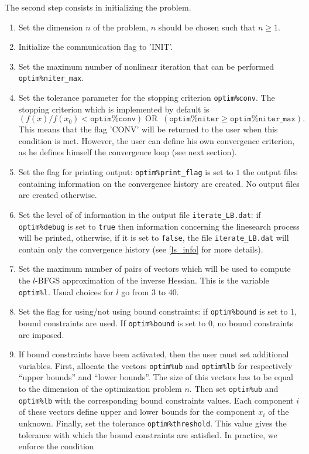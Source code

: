 \documentclass[a4paper,twoside,final,onecolumn,11pt,openright]{article}
\begin{document}
The second step consists in initializing the problem.
\begin{enumerate}
 \item Set the dimension $n$ of the problem, $n$ should be chosen such that $n\geq1$.
 \item Initialize the communication flag to 'INIT'.
 \item Set the maximum number of nonlinear iteration that can be performed \texttt{optim\%niter\_max}.
 \item Set the tolerance parameter for the stopping criterion \texttt{optim\%conv}. The stopping criterion which is implemented by default is 
\begin{equation}
 \left(f(x)/f(x_0)< \texttt{optim\%conv}\right) \; \textrm{OR} \;\;  \left(\texttt{optim\%niter}\geq\texttt{optim\%niter\_max}\right).
\end{equation}
This means that the flag 'CONV' will be returned to the user when this condition is met. However, the user can define his own convergence criterion, as he defines himself the convergence loop (see next section). 
\item  Set the flag for printing output: \texttt{optim\%print\_flag} is set to $1$ the output files containing information on the convergence history are created. No output files are created otherwise.
 \item Set the level of of information in the output file \texttt{iterate\_LB.dat}: if \texttt{optim\%debug} is set to \texttt{true} then information concerning the linesearch process will be printed, otherwise, if it is set to \texttt{false}, the file \texttt{iterate\_LB.dat} will contain only the convergence history (see \ref{ls_info} for more details).
\item Set the maximum number of pairs of vectors which will be used to compute the $l$-BFGS approximation of the inverse Hessian. This is the variable \texttt{optim\%l}. Usual choices for $l$ go from $3$ to $40$. 
\item Set the flag for using/not using bound constraints: if \texttt{optim\%bound} is set to $1$, bound constraints are used. If  \texttt{optim\%bound} is set to $0$, no bound constraints are imposed.
\item If bound constraints have been activated, then the user must set additional variables. First, allocate the vectors \texttt{optim\%ub} and \texttt{optim\%lb} for respectively ``upper bounds'' and ``lower bounds''. The size of this vectors has to be equal to the dimension of the optimization problem $n$. Then set \texttt{optim\%ub} and \texttt{optim\%lb} with the corresponding bound constraints values. Each component $i$ of these vectors define upper and lower bounds for the component $x_i$ of the unknown. Finally, set the tolerance \texttt{optim\%threshold}. This value gives the tolerance with which the bound constraints are satisfied. In practice, we enforce the condition

\end{enumerate}
\end{document}
